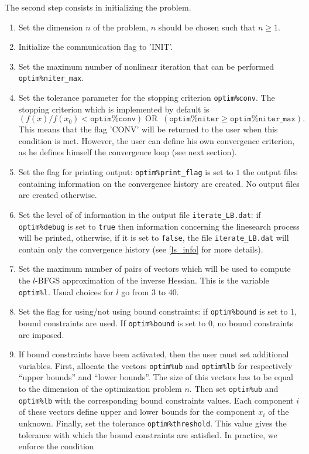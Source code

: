 \documentclass[a4paper,twoside,final,onecolumn,11pt,openright]{article}
\begin{document}
The second step consists in initializing the problem.
\begin{enumerate}
 \item Set the dimension $n$ of the problem, $n$ should be chosen such that $n\geq1$.
 \item Initialize the communication flag to 'INIT'.
 \item Set the maximum number of nonlinear iteration that can be performed \texttt{optim\%niter\_max}.
 \item Set the tolerance parameter for the stopping criterion \texttt{optim\%conv}. The stopping criterion which is implemented by default is 
\begin{equation}
 \left(f(x)/f(x_0)< \texttt{optim\%conv}\right) \; \textrm{OR} \;\;  \left(\texttt{optim\%niter}\geq\texttt{optim\%niter\_max}\right).
\end{equation}
This means that the flag 'CONV' will be returned to the user when this condition is met. However, the user can define his own convergence criterion, as he defines himself the convergence loop (see next section). 
\item  Set the flag for printing output: \texttt{optim\%print\_flag} is set to $1$ the output files containing information on the convergence history are created. No output files are created otherwise.
 \item Set the level of of information in the output file \texttt{iterate\_LB.dat}: if \texttt{optim\%debug} is set to \texttt{true} then information concerning the linesearch process will be printed, otherwise, if it is set to \texttt{false}, the file \texttt{iterate\_LB.dat} will contain only the convergence history (see \ref{ls_info} for more details).
\item Set the maximum number of pairs of vectors which will be used to compute the $l$-BFGS approximation of the inverse Hessian. This is the variable \texttt{optim\%l}. Usual choices for $l$ go from $3$ to $40$. 
\item Set the flag for using/not using bound constraints: if \texttt{optim\%bound} is set to $1$, bound constraints are used. If  \texttt{optim\%bound} is set to $0$, no bound constraints are imposed.
\item If bound constraints have been activated, then the user must set additional variables. First, allocate the vectors \texttt{optim\%ub} and \texttt{optim\%lb} for respectively ``upper bounds'' and ``lower bounds''. The size of this vectors has to be equal to the dimension of the optimization problem $n$. Then set \texttt{optim\%ub} and \texttt{optim\%lb} with the corresponding bound constraints values. Each component $i$ of these vectors define upper and lower bounds for the component $x_i$ of the unknown. Finally, set the tolerance \texttt{optim\%threshold}. This value gives the tolerance with which the bound constraints are satisfied. In practice, we enforce the condition

\end{enumerate}
\end{document}
